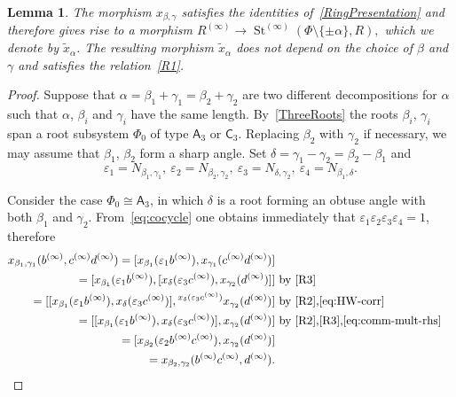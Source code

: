\documentclass{article}
\numberwithin{equation}{section}
\newtheorem{lemma}{Lemma} \numberwithin{lemma}{section}
\theoremstyle{definition}
\theoremstyle{remark}
\DeclareMathOperator\St{St}
\newcommand{\rA}{\mathsf{A}}
\newcommand{\rC}{\mathsf{C}}
\begin{document}
\begin{lemma} The morphism $x_{\beta, \gamma}$ satisfies the identities of~\cref{RingPresentation} and therefore gives rise to a morphism
 $R^{(\infty)} \to \St^{(\infty)}(\Phi\setminus\{\pm\alpha\}, R),$ which we denote by $\widetilde{x}_\alpha$. The resulting morphism $\widetilde{x}_\alpha$ does not depend on the choice of $\beta$ and $\gamma$ and satisfies the relation~\eqref{R1}.
\end{lemma}
\begin{proof}
 Suppose that \(\alpha = \beta_1 + \gamma_1 = \beta_2 + \gamma_2\) are two different decompositions for $\alpha$ such that $\alpha$, $\beta_i$ and $\gamma_i$ have the same length.
 By~\cref{ThreeRoots} the roots $\beta_i$, $\gamma_i$ span a root subsystem $\Phi_0$ of type \(\rA_3\) or \(\rC_3\). 
 Replacing $\beta_2$ with $\gamma_2$ if necessary, we may assume that \(\beta_1\), \(\beta_2\) form a sharp angle.
 Set $\delta = \gamma_1 - \gamma_2 = \beta_2 - \beta_1$ and
 \[\varepsilon_1 = N_{\beta_1, \gamma_1},\ \varepsilon_2 = N_{\beta_2, \gamma_2},\ \varepsilon_3 = N_{\delta,\gamma_2},\ \varepsilon_4 = N_{\beta_1, \delta}.\] 
 
 Consider the case \(\Phi_0 \cong \rA_3\), in which $\delta$ is a root forming an obtuse angle with both $\beta_1$ and $\gamma_2$. 
 From~\eqref{eq:cocycle} one obtains immediately that $\varepsilon_1 \varepsilon_2 \varepsilon_3 \varepsilon_4 = 1$, therefore
 \begin{align*}
 x_{\beta_1, \gamma_1}(b^{(\infty)}, c^{(\infty)} d^{(\infty)}) = [x_{\beta_1}(\varepsilon_1b^{(\infty)}), x_{\gamma_1}(c^{(\infty)}d^{(\infty)})] \\ 
 = [x_{\beta_1}(\varepsilon_1b^{(\infty)}), [x_\delta(\varepsilon_3 c^{(\infty)}), x_{\gamma_2}(d^{(\infty)})]] & \text{ by~\eqref{R3}} \\
 = [[x_{\beta_1}(\varepsilon_1b^{(\infty)}), x_\delta(\varepsilon_3c^{(\infty)})], {}^{x_\delta(\varepsilon_3c^{(\infty)})}x_{\gamma_2}(d^{(\infty)})] & \text{ by~\eqref{R2},\eqref{eq:HW-corr}}\\
 = [[x_{\beta_1}(\varepsilon_1b^{(\infty)}), x_\delta(\varepsilon_3c^{(\infty)})], x_{\gamma_2}(d^{(\infty)})] & \text{ by~\eqref{R2},\eqref{R3},\eqref{eq:comm-mult-rhs}}\\
 = [x_{\beta_2}(\varepsilon_2b^{(\infty)}c^{(\infty)}), x_{\gamma_2}(d^{(\infty)})] \\
 = x_{\beta_2, \gamma_2}(b^{(\infty)} c^{(\infty)}, d^{(\infty)}).
 \end{align*}
 

\end{proof}
\end{document}
